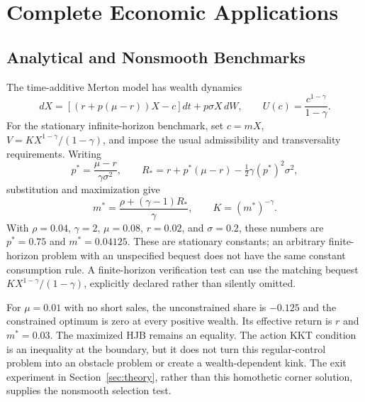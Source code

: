 \section{Complete Economic Applications}\label{app:r15applications}
\subsection{Analytical and Nonsmooth Benchmarks}\label{sec:benchmarks}
The time-additive Merton model has wealth dynamics
\[
 dX=[(r+p(\mu-r))X-c]dt+p\sigma X\,dW,
 \qquad U(c)=\frac{c^{1-\gamma}}{1-\gamma}.
\]
For the stationary infinite-horizon benchmark, set $c=mX$, $V=KX^{1-\gamma}/(1-\gamma)$, and impose the usual admissibility and transversality requirements. Writing
\[
 p^*=\frac{\mu-r}{\gamma\sigma^2},\qquad
 R_*=r+p^*(\mu-r)-\tfrac12\gamma(p^*)^2\sigma^2,
\]
substitution and maximization give
\begin{equation}\label{eq:merton}
 m^*=\frac{\rho+(\gamma-1)R_*}{\gamma},\qquad K=(m^*)^{-\gamma}.
\end{equation}
With $\rho=0.04$, $\gamma=2$, $\mu=0.08$, $r=0.02$, and $\sigma=0.2$, these numbers are $p^*=0.75$ and $m^*=0.04125$. These are stationary constants; an arbitrary finite-horizon problem with an unspecified bequest does not have the same constant consumption rule. A finite-horizon verification test can use the matching bequest $KX^{1-\gamma}/(1-\gamma)$, explicitly declared rather than silently omitted.

For $\mu=0.01$ with no short sales, the unconstrained share is $-0.125$ and the constrained optimum is zero at every positive wealth. Its effective return is $r$ and $m^*=0.03$. The maximized HJB remains an equality. The action KKT condition is an inequality at the boundary, but it does not turn this regular-control problem into an obstacle problem or create a wealth-dependent kink. The exit experiment in Section~\ref{sec:theory}, rather than this homothetic corner solution, supplies the nonsmooth selection test.

